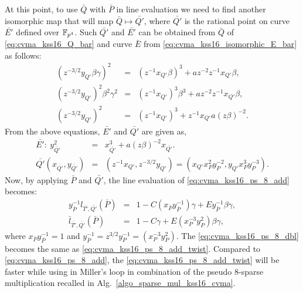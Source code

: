 At this point, to use $\bar{Q}$ with $\bar{P}$ in line evaluation we need to find another isomorphic map that will map $\bar{Q} \mapsto \bar{Q'}$, where $\bar{Q'}$ is the rational point on curve  $\bar{E'}$ defined over $\mathbb{F}_{p^4}$. Such $\bar{Q'}$ and $\bar{E'}$ can be obtained from $\bar{Q}$ of \eqref{eq:cvma_kss16_Q_bar} and curve $\bar{E}$ from \eqref{eq:cvma_kss16_isomorphic_E_bar} as follows:
\begin{eqnarray} 
(z^{-3/2}y_{Q'}\beta\gamma )^2 &=& (z^{-1}x_{Q'}\beta)^3+az^{-2}z^{-1}x_{Q'}\beta, \nonumber \\
(z^{-3/2}y_{Q'})^2 \beta^2 \gamma^2 &=& (z^{-1}x_{Q'})^3\beta^3+az^{-2}z^{-1}x_{Q'}\beta, \nonumber \\
(z^{-3/2}y_{Q'})^2  &=& (z^{-1}x_{Q'})^3+z^{-1}x_{Q'}a(z\beta)^{-2}. \nonumber
\end{eqnarray}
From the above equations, $\bar{E'}$ and $\bar{Q'}$ are given as,
\begin{eqnarray}
\bar{E'}: ~y_{\bar{Q'}}^2 & = & x_{\bar{Q'}}^3+a(z\beta)^{-2}x_{\bar{Q'}}. \label{eq:cvma_kss16_E_bar_prime}\\
\bar{Q'}(x_{\bar{Q'}}, y_{\bar{Q'}}) & = & (z^{-1}x_{Q'}, z^{-3/2}y_{Q'})= 
(x_{Q'} x_P^2y_P^{-2},y_{Q'} x_P^3y_{P}^{-3}) \label{eq:cvma_kss16_Q_bar_prime}. 
\end{eqnarray}
Now, by applying $\bar{P}$ and $\bar{Q'}$, the line evaluation of  \eqref{eq:cvma_kss16_ps_8_add} becomes:
\begin{eqnarray}
y_{\bar{P}}^{-1} l_{\bar{T'},\bar{Q'}}(\bar{P})&=& 1-C(x_{\bar{P}}y_{\bar{P}}^{-1})\gamma+E y_{\bar{P}}^{-1}\beta\gamma,  \nonumber \\
\bar{l}_{\bar{T'},\bar{Q'}}(\bar{P}) &=& 1 -C\gamma+E (x_{P}^{-3} y_{P}^2)\beta\gamma , \label{eq:cvma_kss16_ps_8_add_twist}
\end{eqnarray}
where $x_{\bar{P}}y_{\bar{P}}^{-1}=1$ and $y_{\bar{P}}^{-1} = z^{3/2}y_{P}^{-1}=(x_{P}^{-3} y_{P}^2)$. The \eqref{eq:cvma_kss16_ps_8_dbl} becomes the same as \eqref{eq:cvma_kss16_ps_8_add_twist}. 
Compared to \eqref{eq:cvma_kss16_ps_8_add}, the \eqref{eq:cvma_kss16_ps_8_add_twist} will be faster while using in Miller's loop in combination of the pseudo 8-sparse multiplication recalled in Alg.~\ref{algo_sparse_mul_kss16_cvma}.

